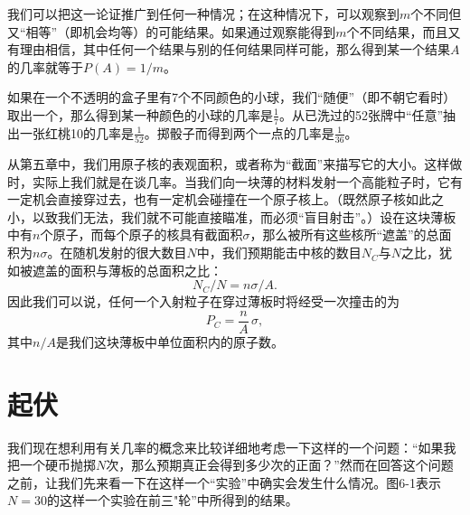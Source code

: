 \documentclass[12pt,oneside]{book}
\begin{document}
我们可以把这一论证推广到任何一种情况；在这种情况下，可以观察到$m$个不同但又“相等”（即机会均等）的可能结果。如果通过观察能得到$m$个不同结果，而且又有理由相信，其中任何一个结果与别的任何结果同样可能，那么得到某一个结果$A$的几率就等于$P(A)=1/m$。

如果在一个不透明的盒子里有7个不同颜色的小球，我们“随便”（即不朝它看时）取出一个，那么得到某一种颜色的小球的几率是$\frac{1}{7}$。从已洗过的52张牌中“任意”抽出一张红桃10的几率是$\frac{1}{52}$。掷骰子而得到两个一点的几率是$ \frac{1}{36} $。
\begin{center}
\makebox[200pt]{\hrulefill}
\end{center}

\begin{small}
从第五章中，我们用原子核的表观面积，或者称为“截面”来描写它的大小。这样做时，实际上我们就是在谈几率。当我们向一块薄的材料发射一个高能粒子时，它有一定机会直接穿过去，也有一定机会碰撞在一个原子核上。（既然原子核如此之小，以致我们无法，我们就不可能直接瞄准，而必须“盲目射击”。）设在这块薄板中有$n$个原子，而每个原子的核具有截面积$\sigma$，那么被所有这些核所“遮盖”的总面积为$n\sigma$。在随机发射的很大数目$N$中，我们预期能击中核的数目$N_C$与$N$之比，犹如被遮盖的面积与薄板的总面积之比：
\begin{equation}
\label{Eq:I:6:2}
N_C/N=n\sigma/A.
\end{equation}
因此我们可以说，任何一个入射粒子在穿过薄板时将经受一次撞击的为
\begin{equation}
\label{Eq:I:6:3}
P_C=\frac{n}{A}\,\sigma,
\end{equation}
其中$n/A$是我们这块薄板中单位面积内的原子数。
\end{small}



\section{起伏}
我们现在想利用有关几率的概念来比较详细地考虑一下这样的一个问题：“如果我把一个硬币抛掷$N$次，那么预期真正会得到多少次的正面？”然而在回答这个问题之前，让我们先来看一下在这样一个“实验”中确实会发生什么情况。图6-1表示$N=30$的这样一个实验在前三"轮”中所得到的结果。
\end{document}
